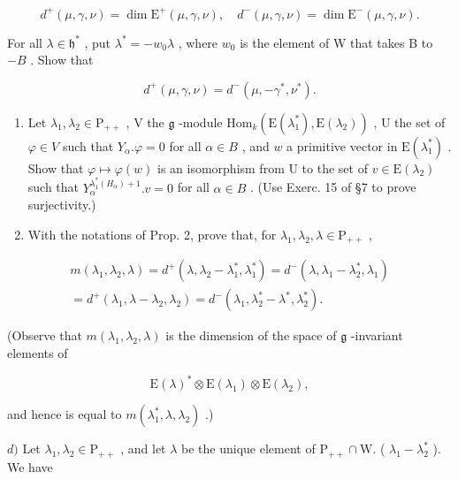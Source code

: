 \[
d ^ {+} (\mu , \gamma , \nu) = \dim \mathrm{E} ^ {+} (\mu , \gamma , \nu), \quad d ^ {-} (\mu , \gamma , \nu) = \dim \mathrm{E} ^ {-} (\mu , \gamma , \nu).
\]

For all \(\lambda \in \mathfrak{h}^*\) , put \(\lambda^{*} = -w_{0}\lambda\) , where \(w_{0}\) is the element of W that takes B to \(-B\) . Show that

\[
d ^ {+} (\mu , \gamma , \nu) = d ^ {-} (\mu , - \gamma^ {*}, \nu^ {*}).
\]

\begin{enumerate}
\def\labelenumi{\alph{enumi})}
\setcounter{enumi}{1}
\item
  Let \(\lambda_1, \lambda_2 \in \mathrm{P}_{++}\) , V the \(\mathfrak{g}\) -module \(\mathrm{Hom}_k(\mathrm{E}(\lambda_1^*), \mathrm{E}(\lambda_2))\) , U the set of \(\varphi \in V\) such that \(Y_\alpha. \varphi = 0\) for all \(\alpha \in B\) , and \(w\) a primitive vector in \(\mathrm{E}(\lambda_1^*)\) . Show that \(\varphi \mapsto \varphi(w)\) is an isomorphism from U to the set of \(v \in \mathrm{E}(\lambda_2)\) such that \(Y_\alpha^{\lambda_1^*(H_\alpha)+1}. v = 0\) for all \(\alpha \in B\) . (Use Exerc. 15 of §7 to prove surjectivity.)
\item
  With the notations of Prop. 2, prove that, for \(\lambda_1, \lambda_2, \lambda \in \mathrm{P}_{++}\) ,
\end{enumerate}

\[
\begin{array}{r} m (\lambda_ {1}, \lambda_ {2}, \lambda) = d ^ {+} (\lambda , \lambda_ {2} - \lambda_ {1} ^ {*}, \lambda_ {1} ^ {*}) = d ^ {-} (\lambda , \lambda_ {1} - \lambda_ {2} ^ {*}, \lambda_ {1}) \\ = d ^ {+} (\lambda_ {1}, \lambda - \lambda_ {2}, \lambda_ {2}) = d ^ {-} (\lambda_ {1}, \lambda_ {2} ^ {*} - \lambda^ {*}, \lambda_ {2} ^ {*}). \end{array}
\]

(Observe that \(m(\lambda_1,\lambda_2,\lambda)\) is the dimension of the space of \(\mathfrak{g}\) -invariant elements of

\[
\mathrm{E} (\lambda) ^ {*} \otimes \mathrm{E} (\lambda_ {1}) \otimes \mathrm{E} (\lambda_ {2}),
\]

and hence is equal to \(m(\lambda_1^*, \lambda, \lambda_2)\) .)

\(d)\) Let \(\lambda_1, \lambda_2 \in \mathrm{P}_{++}\) , and let \(\lambda\) be the unique element of \(\mathrm{P}_{++} \cap \mathrm{W}.\) ( \(\lambda_1 - \lambda_2^*\) ). We have

